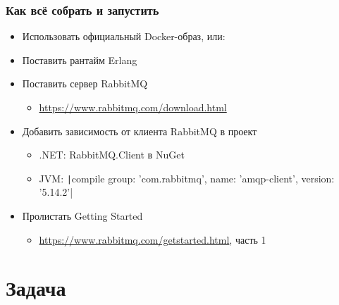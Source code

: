 \documentclass[xetex,mathserif,serif]{beamer}
\begin{document}
    \begin{frame}
        \frametitle{Как всё собрать и запустить}
        \begin{itemize}
            \item Использовать официальный Docker-образ, или:
            \item Поставить рантайм Erlang
            \item Поставить сервер RabbitMQ
            \begin{itemize}
                \item \url{https://www.rabbitmq.com/download.html}
            \end{itemize}
            \item Добавить зависимость от клиента RabbitMQ в проект
            \begin{itemize}
                \item .NET: RabbitMQ.Client в NuGet
                \item JVM: \texttt|compile group: 'com.rabbitmq', name: 'amqp-client', version: '5.14.2'|
            \end{itemize}
            \item Пролистать Getting Started 
            \begin{itemize}
                \item \url{https://www.rabbitmq.com/getstarted.html}, часть 1
            \end{itemize}
        \end{itemize}
    \end{frame}

    \section{Задача}
\end{document}

